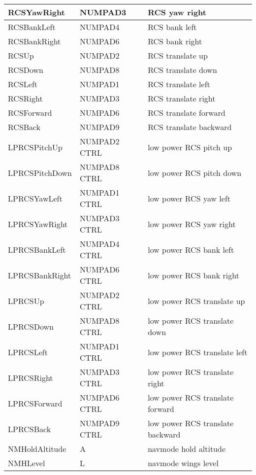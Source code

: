 \documentclass[Orbiter User Manual.tex]{subfiles}
\begin{document}
\begin{longtable}{ |p{}|p{}|p{}| }
	\hline\rule{0pt}{2ex}
	RCSYawRight & NUMPAD3 & RCS yaw right\\
	\hline\rule{0pt}{2ex}
	RCSBankLeft & NUMPAD4 & RCS bank left\\
	\hline\rule{0pt}{2ex}
	RCSBankRight & NUMPAD6 & RCS bank right\\
	\hline\rule{0pt}{2ex}
	RCSUp & NUMPAD2 & RCS translate up\\
	\hline\rule{0pt}{2ex}
	RCSDown & NUMPAD8 & RCS translate down\\
	\hline\rule{0pt}{2ex}
	RCSLeft & NUMPAD1 & RCS translate left\\
	\hline\rule{0pt}{2ex}
	RCSRight & NUMPAD3 & RCS translate right\\
	\hline\rule{0pt}{2ex}
	RCSForward & NUMPAD6 & RCS translate forward\\
	\hline\rule{0pt}{2ex}
	RCSBack & NUMPAD9 & RCS translate backward\\
	\hline\rule{0pt}{2ex}
	LPRCSPitchUp & NUMPAD2 CTRL & low power RCS pitch up\\
	\hline\rule{0pt}{2ex}
	LPRCSPitchDown & NUMPAD8 CTRL & low power RCS pitch down\\
	\hline\rule{0pt}{2ex}
	LPRCSYawLeft & NUMPAD1 CTRL & low power RCS yaw left\\
	\hline\rule{0pt}{2ex}
	LPRCSYawRight & NUMPAD3 CTRL & low power RCS yaw right\\
	\hline\rule{0pt}{2ex}
	LPRCSBankLeft & NUMPAD4 CTRL & low power RCS bank left\\
	\hline\rule{0pt}{2ex}
	LPRCSBankRight & NUMPAD6 CTRL & low power RCS bank right\\
	\hline\rule{0pt}{2ex}
	LPRCSUp & NUMPAD2 CTRL & low power RCS translate up\\
	\hline\rule{0pt}{2ex}
	LPRCSDown & NUMPAD8 CTRL & low power RCS translate down\\
	\hline\rule{0pt}{2ex}
	LPRCSLeft & NUMPAD1 CTRL & low power RCS translate left\\
	\hline\rule{0pt}{2ex}
	LPRCSRight & NUMPAD3 CTRL & low power RCS translate right\\
	\hline\rule{0pt}{2ex}
	LPRCSForward & NUMPAD6 CTRL & low power RCS translate forward\\
	\hline\rule{0pt}{2ex}
	LPRCSBack & NUMPAD9 CTRL & low power RCS translate backward\\
	\hline\rule{0pt}{2ex}
	NMHoldAltitude & A & navmode hold altitude\\
	\hline\rule{0pt}{2ex}
	NMHLevel & L & navmode wings level\\

\end{longtable}
\end{document}
